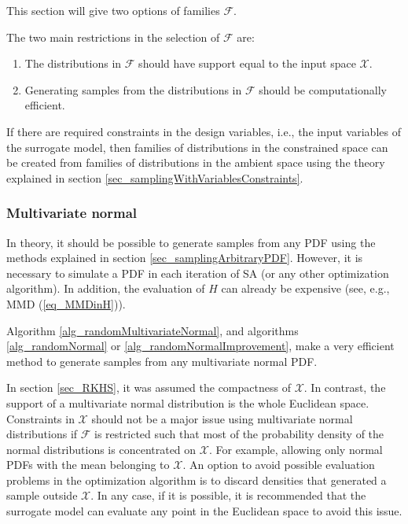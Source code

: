 This section will give two options of families $\mathcal{F}$.

The two main restrictions in the selection of $\mathcal{F}$ are:
\begin{enumerate}  
  \item The distributions in $\mathcal{F}$ should have support equal to the input space $\mathcal{X}$.
  \item Generating samples from the distributions in $\mathcal{F}$ should be computationally efficient. 
\end{enumerate}

\begin{remark} \label{remark_constraintsInDesignVariables}
If there are required constraints in the design variables, i.e., the input variables of the surrogate model, then families of distributions in the constrained space can be created from families of distributions in the ambient space using the theory explained in section \ref{sec_samplingWithVariablesConstraints}.
\end{remark}

\subsubsection{Multivariate normal}

In theory, it should be possible to generate samples from any PDF using the methods explained in section \ref{sec_samplingArbitraryPDF}. 
However, it is necessary to simulate a PDF in each iteration of SA (or any other optimization algorithm). 
In addition, the evaluation of $H$ can already be expensive (see, e.g., MMD (\ref{eq_MMDinH})). 

Algorithm \ref{alg_randomMultivariateNormal}, and algorithms \ref{alg_randomNormal} or \ref{alg_randomNormalImprovement}, make a very efficient method to generate samples from any multivariate normal PDF. 

In section \ref{sec_RKHS}, it was assumed the compactness of $\mathcal{X}$. 
In contrast, the support of a multivariate normal distribution is the whole Euclidean space.
Constraints in $\mathcal{X}$ should not be a major issue using multivariate normal distributions if $\mathcal{F}$ is restricted such that most of the probability density of the normal distributions is concentrated on $\mathcal{X}$. 
For example, allowing only normal PDFs with the mean belonging to $\mathcal{X}$. 
An option to avoid possible evaluation problems in the optimization algorithm is to discard densities that generated a sample outside $\mathcal{X}$.
In any case, if it is possible, it is recommended that the surrogate model can evaluate any point in the Euclidean space to avoid this issue.

